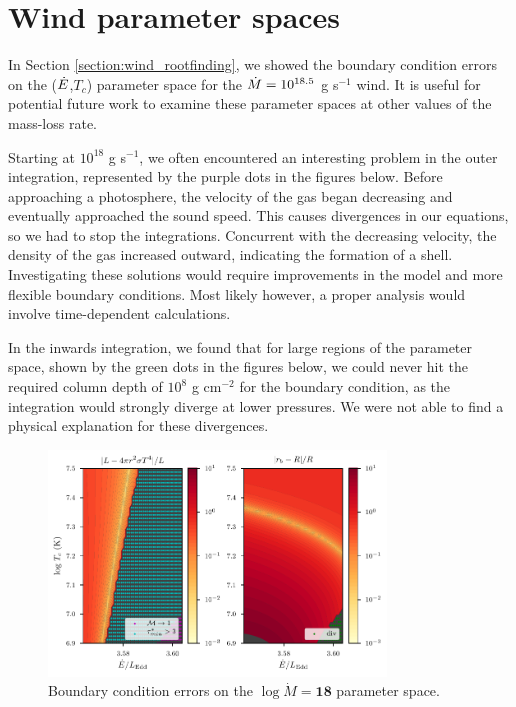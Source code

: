 \documentclass[../main.tex]{subfiles}
\begin{document}
\chapter{Wind parameter spaces}\label{appendix_errospaces}
In Section \ref{section:wind_rootfinding}, we showed the boundary condition errors on the ($\dot{E}$,$T_c$) parameter space for the $\dot{M}=10^{18.5}$ g s$^{-1}$ wind. It is useful for potential future work to examine these parameter spaces at other values of the mass-loss rate. 

Starting at $10^{18}$ g s$^{-1}$, we often encountered an interesting problem in the outer integration, represented by the purple dots in the figures below. Before approaching a photosphere, the velocity of the gas began decreasing and eventually approached the sound speed. This causes divergences in our equations, so we had to stop the integrations. Concurrent with the decreasing velocity, the density of the gas increased outward, indicating the formation of a shell. Investigating these solutions would require improvements in the model and more flexible boundary conditions. Most likely however, a proper analysis would involve time-dependent calculations.

In the inwards integration, we found that for large regions of the parameter space, shown by the green dots in the figures below, we could never hit the required column depth of $10^8$ g cm$^{-2}$ for the boundary condition, as the integration would strongly diverge at lower pressures. We were not able to find a physical explanation for these divergences.


\begin{figure}[ht!]
    \centering
    \includegraphics[width=0.8\textwidth]{figures/errorspace_18.pdf}
    \vspace*{-0.5cm}
    \caption*{Boundary condition errors on the $\log\dot{M}=\bm{18}$ parameter space.}
    \label{fig:errorspace_18}
\end{figure}
\end{document}
